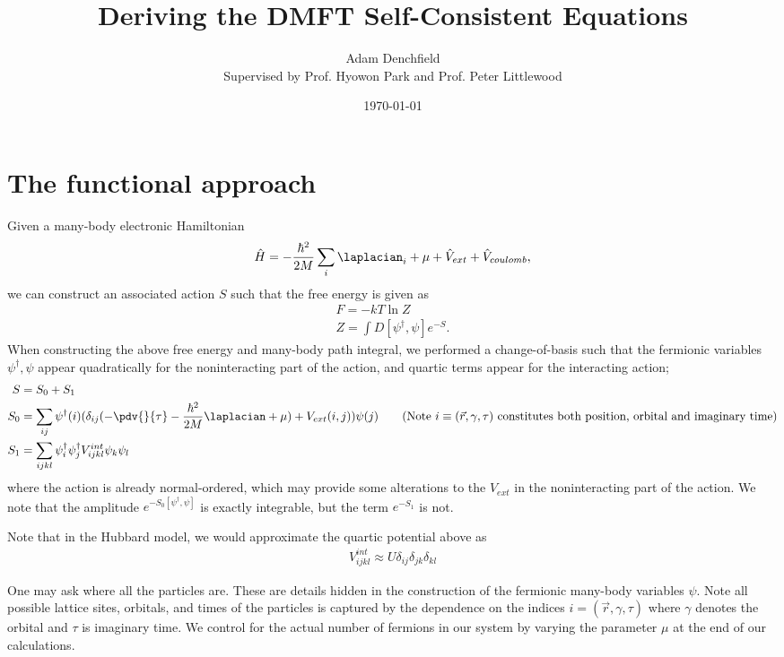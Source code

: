 \documentclass{article}
\begin{document}
\title{Deriving the DMFT Self-Consistent Equations}
\author{Adam Denchfield \\ Supervised by Prof. Hyowon Park and Prof. Peter Littlewood}
\date{\today{}}
\maketitle
\tableofcontents
\section{The functional approach}

Given a many-body electronic Hamiltonian
\begin{align*}
  \hat H = -\frac{\hbar^2}{2M}\sum_i \laplacian_i + \mu + \hat V_{ext} + \hat V_{coulomb},
\end{align*}
we can construct an associated action $S$ such that the free energy is given as
\begin{align*}
  F = -kT \ln Z \\
  Z = \int D[\psi^\dagger, \psi] e^{-S}.
\end{align*}
When constructing the above free energy and many-body path integral, we performed a change-of-basis such that the fermionic variables $\psi^\dagger, \psi$ appear quadratically for the noninteracting part of the action, and quartic terms appear for the interacting action;
\begin{align*}
  S & = S_{0} + S_1 \\
  S_0 & = \sum_{ij} \psi^\dagger (i)(\delta_{ij}(-\pdv{}{\tau} - \frac{\hbar^2}{2M}\laplacian + \mu) + V_{ext}(i, j)) \psi(j) \tag{Note $i \equiv (\vec r, \gamma, \tau)$ constitutes both position, orbital and imaginary time}\\
  S_1 & =\sum_{ijkl} \psi^\dagger_i \psi^\dagger_j V^{int}_{ijkl} \psi_k \psi_l
\end{align*}
where the action is already normal-ordered, which may provide some alterations to the $V_{ext}$ in the noninteracting part of the action. We note that the amplitude $e^{-S_0[\psi^\dagger, \psi]}$ is exactly integrable, but the term $e^{-S_1}$ is not.
\begin{remark}
  Note that in the Hubbard model, we would approximate the quartic potential above as
  \begin{align*}
    V^{int}_{ijkl} \approx U\delta_{ij}\delta_{jk}\delta_{kl}
  \end{align*}

\end{remark}
\begin{remark}
  One may ask where all the particles are. These are details hidden in the construction of the fermionic many-body variables $\psi$. Note all possible lattice sites, orbitals, and times of the particles is captured by the dependence on the indices $i=(\vec r, \gamma, \tau)$ where $\gamma$ denotes the orbital and $\tau$ is imaginary time. We control for the actual number of fermions in our system by varying the parameter $\mu$ at the end of our calculations.
\end{remark}
\end{document}
